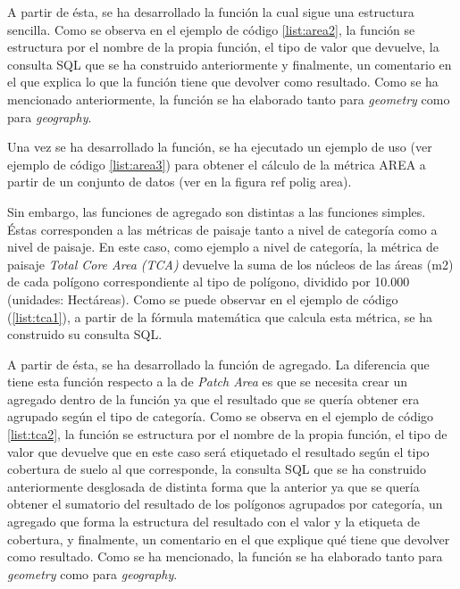 \label{list:area1}

A partir de ésta, se ha desarrollado la función la cual sigue una estructura sencilla. Como se observa en el ejemplo de código \ref{list:area2}, la función se estructura por el nombre de la propia función, el tipo de valor que devuelve, la consulta SQL que se ha construido anteriormente y finalmente, un comentario en el que explica lo que la función tiene que devolver como resultado. Como se ha mencionado anteriormente, la función se ha elaborado tanto para \textit{geometry} como para \textit{geography}.

\label{list:area2}

Una vez se ha desarrollado la función, se ha ejecutado un ejemplo de uso (ver ejemplo de código \ref{list:area3}) para obtener el cálculo de la métrica AREA a partir de un conjunto de datos (ver en la figura ref polig area).

\label{list:area3}

Sin embargo, las funciones de agregado son distintas a las funciones simples. Éstas corresponden a las métricas de paisaje tanto a nivel de categoría como a nivel de paisaje. En este caso, como ejemplo a nivel de categoría, la métrica de paisaje \textit{Total Core Area (TCA)} devuelve la suma de los núcleos de las áreas (m2) de cada polígono correspondiente al tipo de polígono, dividido por 10.000 (unidades: Hectáreas). Como se puede observar en el ejemplo de código (\ref{list:tca1}), a partir de la fórmula matemática que calcula esta métrica, se ha construido su consulta SQL.

\label{list:tca1}

A partir de ésta, se ha desarrollado la función de agregado. La diferencia que tiene esta función respecto a la de \textit{Patch Area} es que se necesita crear un agregado dentro de la función ya que el resultado que se quería obtener era agrupado según el tipo de categoría. Como se observa en el ejemplo de código \ref{list:tca2}, la función se estructura por el nombre de la propia función, el tipo de valor que devuelve que en este caso será etiquetado el resultado según el tipo cobertura de suelo al que corresponde, la consulta SQL que se ha construido anteriormente desglosada de distinta forma que la anterior ya que se quería obtener el sumatorio del resultado de los polígonos agrupados por categoría, un agregado que forma la estructura del resultado con el valor y la etiqueta de cobertura, y finalmente, un comentario en el que explique qué tiene que devolver como resultado. Como se ha mencionado, la función se ha elaborado tanto para \textit{geometry} como para \textit{geography}.

